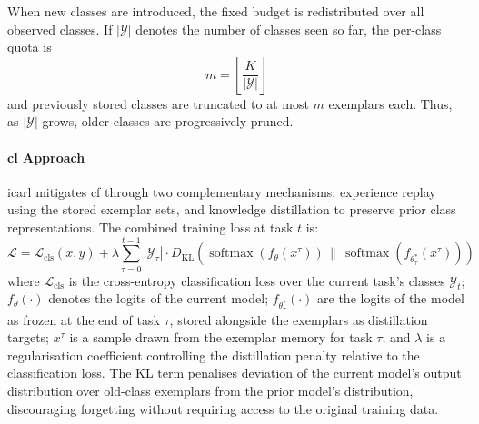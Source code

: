When new classes are introduced, the fixed budget is redistributed over all observed classes. If \(|\mathcal{Y}|\) denotes the number of classes seen so far, the per-class quota is
\begin{equation}
    m=\left\lfloor \frac{K}{|\mathcal{Y}|}\right\rfloor
\end{equation}
and previously stored classes are truncated to at most \(m\) exemplars each. Thus, as \(|\mathcal{Y}|\) grows, older classes are progressively pruned.

\paragraph{\gls{cl} Approach}
\gls{icarl} mitigates \gls{cf} through two complementary mechanisms: experience replay using the stored exemplar sets, and knowledge distillation to preserve prior class representations. The combined training loss at task $t$ is:
%
\begin{equation}\label{eqn:icarl_loss}
    \mathcal{L} = \mathcal{L}_\text{cls}(x, y)
    + \lambda \sum_{\tau=0}^{t-1} |\mathcal{Y}_\tau| \cdot
      D_\text{KL}\!\left(
        \operatorname{softmax}\!\left(f_\theta(x^\tau)\right)
        \,\Big\|\,
        \operatorname{softmax}\!\left(f_{\theta^*_\tau}(x^\tau)\right)
      \right)
\end{equation}
%
where $\mathcal{L}_\text{cls}$ is the cross-entropy classification loss over the current task's classes $\mathcal{Y}_t$; $f_\theta(\cdot)$ denotes the logits of the current model; $f_{\theta^*_\tau}(\cdot)$ are the logits of the model as frozen at the end of task $\tau$, stored alongside the exemplars as distillation targets; $x^\tau$ is a sample drawn from the exemplar memory for task $\tau$; and $\lambda$ is a regularisation coefficient controlling the distillation penalty relative to the classification loss. The KL term penalises deviation of the current model's output distribution over old-class exemplars from the prior model's distribution, discouraging forgetting without requiring access to the original training data.

